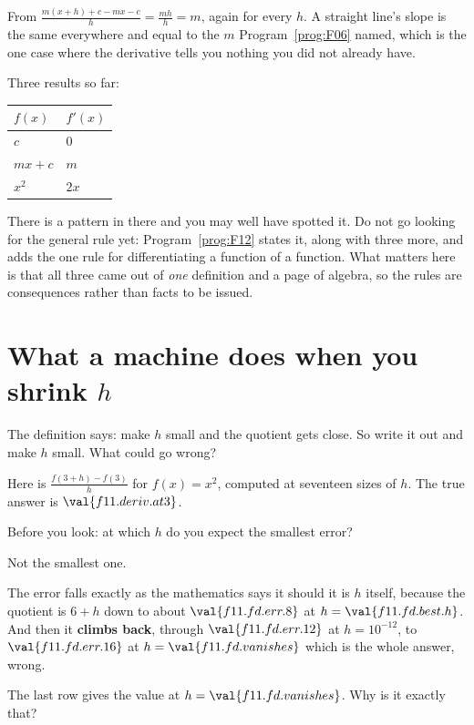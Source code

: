 \begin{fr}
From $\frac{m(x+h) + c - mx - c}{h} = \frac{mh}{h} = m$, again for every $h$.
A straight line's slope is the same everywhere and equal to the $m$
Program~\ref{prog:F06} named, which is the one case where the derivative tells
you nothing you did not already have.

Three results so far:

\begin{center}
\begin{tabular}{ll}
\toprule
$f(x)$ & $f'(x)$ \\
\midrule
$c$ & $0$ \\
$mx + c$ & $m$ \\
$x^{2}$ & $2x$ \\
\bottomrule
\end{tabular}
\end{center}

There is a pattern in there and you may well have spotted it. Do not go
looking for the general rule yet: Program~\ref{prog:F12} states it, along with
three more, and adds the one rule for differentiating a function of a
function. What matters here is that all three
came out of \emph{one} definition and a page of algebra, so the rules are
consequences rather than facts to be issued.
\end{fr}

\section{What a machine does when you shrink $h$}
\label{sec:F11-machine}

\begin{fr}
The definition says: make $h$ small and the quotient gets close. So write it
out and make $h$ small. What could go wrong?

Here is $\frac{f(3+h) - f(3)}{h}$ for $f(x) = x^{2}$, computed at seventeen
sizes of $h$. The true answer is $\val{f11.deriv.at3}$.

Before you look: at which $h$ do you expect the smallest error?
\dotline
\nextframe
\end{fr}

\begin{fr}
\begin{ansblock}
Not the smallest one.
\end{ansblock}


The error falls exactly as the mathematics says it should \dash{} it is $h$
itself, because the quotient is $6 + h$ \dash{} down to about
$\val{f11.fd.err.8}$ at $h = \val{f11.fd.best.h}$. And then it \textbf{climbs
back}, through $\val{f11.fd.err.12}$ at $h = 10^{-12}$, to
$\val{f11.fd.err.16}$ at $h = \val{f11.fd.vanishes}$ \dash{} which is the
whole answer, wrong.

The last row gives the value at $h = \val{f11.fd.vanishes}$. Why is it
exactly that?
\nextframe
\end{fr}

